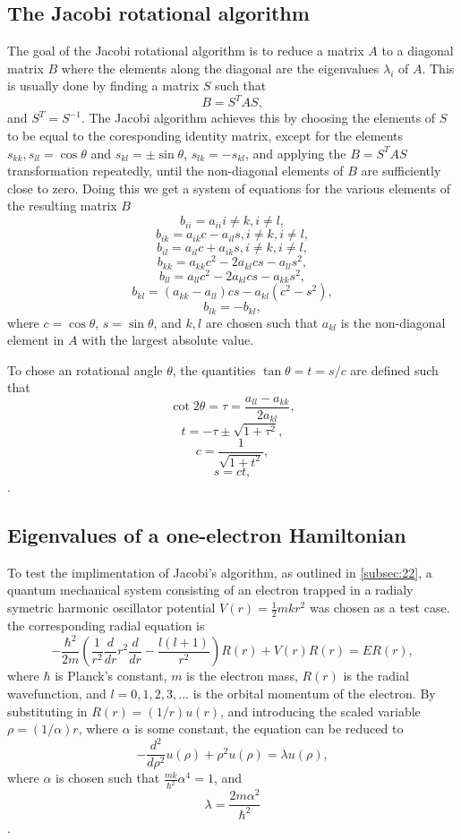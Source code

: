 \documentclass[english,notitlepage,reprint]{revtex4-1}  %
\begin{document}
\subsection{The Jacobi rotational algorithm}\label{subsec:22}
The goal of the Jacobi rotational algorithm is to reduce a matrix \(A\) to a diagonal matrix \(B\) where the elements along the diagonal are the eigenvalues \(\lambda_{i}\) of \(A\). This is usually done by finding a matrix \(S\) such that
$$
	B = S^{T}AS,
$$
and \(S^{T}=S^{-1}\)\citep{Hjorth-Jensen2019}. The Jacobi algorithm achieves this by choosing the elements of \(S\) to be equal to the coresponding identity matrix, except for the elements \(s_{kk},s_{ll}=\cos\theta\) and \(s_{kl} = \pm \sin\theta\), \(s_{lk} = -s_{kl}\)\citep{Hjorth-Jensen2019}, and applying the \(B = S^{T}AS\) transformation repeatedly, until the non-diagonal elements of \(B\) are sufficiently close to zero. Doing this we get a system of equations for the various elements of the resulting matrix \(B\)
$$
	b_{ii}=a_{ii} i\neq k, i\neq l,
$$
$$
	b_{ik}=a_{ik}c-a_{il}s, i\neq k, i\neq l,
$$
$$
	b_{il}=a_{il}c+a_{ik}s, i\neq k, i\neq l,
$$
$$
	b_{kk}=a_{kk}c^{2}-2a_{kl}cs-a_{ll}s^{2},
$$
$$
	b_{ll}=a_{ll}c^{2}-2a_{kl}cs-a_{kk}s^{2},
$$
$$
	b_{kl}=\left(a_{kk}-a_{ll}\right)cs-a_{kl}\left(c^{2}-s^{2}\right),
$$
$$
	b_{lk}=-b_{kl},
$$
where \(c = \cos\theta\), \(s = \sin\theta\), and \(k,l\) are chosen such that \(a_{kl}\) is the non-diagonal element in \(A\) with the largest absolute value.

To chose an rotational angle \(\theta\), the quantities \(\tan\theta=t=s/c\) are defined such that
$$
	\cot 2\theta = \tau = \frac{a_{ll}-a_{kk}}{2a_{kl}},
$$
$$
	t = -\tau \pm \sqrt{1+\tau^{2}},
$$
$$
	c = \frac{1}{\sqrt{1+t^{2}}},
$$
$$
	s = ct,
$$
\citep{Hjorth-Jensen2019}.

\subsection{Eigenvalues of a one-electron Hamiltonian}\label{subsec:23}
To test the implimentation of Jacobi's algorithm, as outlined in \autoref{subsec:22}, a quantum mechanical system consisting of an electron trapped in a radialy symetric harmonic oscillator potential \(V(r)=\frac{1}{2}mkr^{2}\) was chosen as a test case.
the corresponding radial equation is
$$
	-\frac{\hbar^{2}}{2m}\left(\frac{1}{r^{2}}\frac{d}{dr}r^{2}\frac{d}{dr}-\frac{l\left(l+1\right)}{r^{2}}\right)R(r)+V(r)R(r)=ER(r),
$$
where \(\hbar\) is Planck's constant, \(m\) is the electron mass, \(R(r)\) is the radial wavefunction,  and \(l=0,1,2,3,...\) is the orbital momentum of the electron\citep{DepartmentofPhysics2019}. By substituting in \(R(r) = (1/r)u(r)\), and introducing the scaled variable \(\rho = (1/\alpha)r\), where \(\alpha\) is some constant, the equation can be reduced to
$$
	-\frac{d^{2}}{d\rho^{2}}u(\rho)+\rho^{2}u(\rho)=\lambda u(\rho),
$$
where \(\alpha\) is chosen such that \(\frac{mk}{\hbar^{2}}\alpha^{4} = 1\), and
$$
	\lambda=\frac{2m\alpha^{2}}{\hbar^{2}}
$$
\citep{DepartmentofPhysics2019}.
\end{document}
